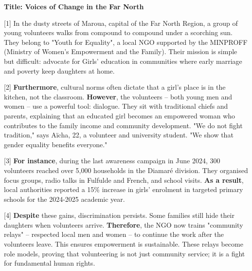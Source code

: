 \documentclass[11pt]{article}
\newcommand{\cle}[1]{{\popxbold\color{popdark}#1}}
\newcounter{popsec}
\newcounter{popsub}
\newcommand{\courssub}[1]{%
  \stepcounter{popsub}%
  \par\vspace{9pt}\noindent{\popxbold\fontsize{11.5}{13}\selectfont\color{popink}{\color{poporange}\thepopsec.\thepopsub}\hspace{6pt}#1}\par\nopagebreak\vspace{4pt}
}
\begin{document}
\begin{exemplebox}
\textbf{Title: Voices of Change in the Far North}

[1] In the dusty streets of Maroua, capital of the Far North Region, a group of young volunteers walks from compound to compound under a scorching sun. They belong to "Youth for Equality", a local \cle{NGO} supported by the \cle{MINPROFF} (Ministry of Women's Empowerment and the Family). Their mission is simple but difficult: \cle{advocate} for \cle{Girls' education} in communities where early marriage and poverty keep daughters at home.

[2] \textbf{Furthermore}, cultural norms often dictate that a girl's place is in the kitchen, not the classroom. \textbf{However}, the volunteers -- both young men and women -- use a powerful tool: dialogue. They sit with traditional chiefs and parents, explaining that an educated girl becomes an empowered woman who contributes to the family income and community development. "We do not fight tradition," says Aïcha, 22, a volunteer and university student. "We show that \cle{gender equality} benefits everyone."

[3] \textbf{For instance}, during the last \cle{awareness campaign} in June 2024, 300 volunteers reached over 5,000 households in the Diamaré division. They organised focus groups, radio talks in Fulfulde and French, and school visits. \textbf{As a result}, local authorities reported a 15\% increase in girls' enrolment in targeted primary schools for the 2024-2025 academic year.

[4] \textbf{Despite} these gains, \cle{discrimination} persists. Some families still hide their daughters when volunteers arrive. \textbf{Therefore}, the NGO now trains "community relays" -- respected local men and women -- to continue the work after the volunteers leave. This ensures \cle{empowerment} is sustainable. These relays become \cle{role models}, proving that \cle{volunteering} is not just \cle{community service}; it is a fight for fundamental \cle{human rights}.
\end{exemplebox}

\courssub{Comprehension Activities}
\end{document}
